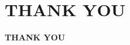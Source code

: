 \documentclass{beamer}
\begin{document}

\section*{THANK YOU}
\begin{frame}
\Huge{\centerline{\textbf{THANK YOU}}}
\end{frame}

\end{document}
